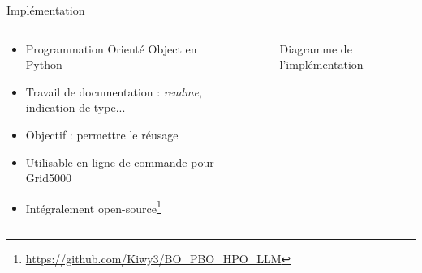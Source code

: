 \begin{frame}{Implémentation}
    \begin{columns}
        \begin{column}[t]{0.45\textwidth} 
            \begin{block}{}
                
                \begin{itemize}
                    \item Programmation Orienté Object en Python
                    \item Travail de documentation : \textit{readme}, indication de type...
                    \item Objectif : permettre le réusage
                    \item Utilisable en ligne de commande pour Grid5000
                    \item Intégralement open-source\footnote[2]{\url{https://github.com/Kiwy3/BO_PBO_HPO_LLM}}
                \end{itemize}
            \end{block}
     
            \end{column}
                 
            \begin{column}[t]{0.45\textwidth}
                \begin{figure}
                    \centering
                    
                    \caption{Diagramme de l'implémentation}
                \end{figure}
            \end{column}
                 
    \end{columns}


\end{frame}
